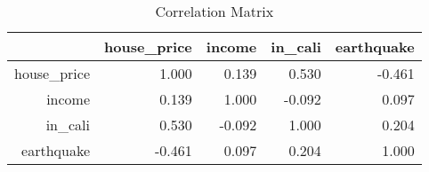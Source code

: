 \begin{table}[ht]
\centering
\begin{tabular}{rrrrr}
  \hline
 & house\_price & income & in\_cali & earthquake \\ 
  \hline
house\_price & 1.000 & 0.139 & 0.530 & -0.461 \\ 
  income & 0.139 & 1.000 & -0.092 & 0.097 \\ 
  in\_cali & 0.530 & -0.092 & 1.000 & 0.204 \\ 
  earthquake & -0.461 & 0.097 & 0.204 & 1.000 \\ 
   \hline
\end{tabular}
\caption{Correlation Matrix} 
\label{tab:corr}
\end{table}

